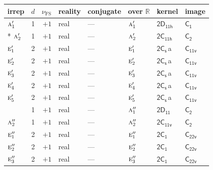 \documentclass[10pt,a4paper]{article}
\numberwithin{equation}{section}
\newcommand{\grp}[1]{\mathsf{#1}}
\newcommand{\irr}[1]{\text{\normalfont\scshape #1}}
\newcommand{\detbox}[1]{{\setlength{\fboxsep}{1pt}\fbox{#1}}}
\newcommand{\clsletter}[1]{\,{\scriptsize\color{black!55}#1}}
\newcommand{\fsind}{\nu_{\mathrm{FS}}}
\begin{document}
\setlength{\emergencystretch}{2em}\par\setlength{\emergencystretch}{0pt}
{\small\renewcommand{\arraystretch}{1.25}\setlength{\tabcolsep}{4pt}\begin{longtable}{@{}lrrlllll@{}}\toprule
irrep & $d$ & $\fsind$ & reality & conjugate & over $\mathbb{R}$ & kernel & image\\\midrule\endhead
\bottomrule\endfoot\endlastfoot
$\irr{a}_{1}'$ & 1 & $+1$ & real & --- & $\irr{a}_{1}'$ & \href{2D11h.pdf}{$\grp{2D_{11h}}$} & \href{../../../rotation/data/pdf/C1.pdf}{$\grp{C_{1}}$}\\*
$\irr{a}_{2}'$ & 1 & $+1$ & real & --- & $\irr{a}_{2}'$ & \href{2C11h.pdf}{$\grp{2C_{11h}}$} & \href{../../../rotation/data/pdf/C2.pdf}{$\grp{C_{2}}$}\\
$\irr{e}_{1}'$ & 2 & $+1$ & real & --- & $\irr{e}_{1}'$ & \href{2C1v.pdf}{$\grp{2C_{s}}$}\clsletter{a} & \href{../../../rotation/data/pdf/C11v.pdf}{$\grp{C_{11v}}$}\\
$\irr{e}_{2}'$ & 2 & $+1$ & real & --- & $\irr{e}_{2}'$ & \href{2C1v.pdf}{$\grp{2C_{s}}$}\clsletter{a} & \href{../../../rotation/data/pdf/C11v.pdf}{$\grp{C_{11v}}$}\\
$\irr{e}_{3}'$ & 2 & $+1$ & real & --- & $\irr{e}_{3}'$ & \href{2C1v.pdf}{$\grp{2C_{s}}$}\clsletter{a} & \href{../../../rotation/data/pdf/C11v.pdf}{$\grp{C_{11v}}$}\\
$\irr{e}_{4}'$ & 2 & $+1$ & real & --- & $\irr{e}_{4}'$ & \href{2C1v.pdf}{$\grp{2C_{s}}$}\clsletter{a} & \href{../../../rotation/data/pdf/C11v.pdf}{$\grp{C_{11v}}$}\\
$\irr{e}_{5}'$ & 2 & $+1$ & real & --- & $\irr{e}_{5}'$ & \href{2C1v.pdf}{$\grp{2C_{s}}$}\clsletter{a} & \href{../../../rotation/data/pdf/C11v.pdf}{$\grp{C_{11v}}$}\\
\detbox{$\irr{a}_{1}''$} & 1 & $+1$ & real & --- & $\irr{a}_{1}''$ & \href{2D11.pdf}{$\grp{2D_{11}}$} & \href{../../../rotation/data/pdf/C2.pdf}{$\grp{C_{2}}$}\\
$\irr{a}_{2}''$ & 1 & $+1$ & real & --- & $\irr{a}_{2}''$ & \href{2C11v.pdf}{$\grp{2C_{11v}}$} & \href{../../../rotation/data/pdf/C2.pdf}{$\grp{C_{2}}$}\\
$\irr{e}_{1}''$ & 2 & $+1$ & real & --- & $\irr{e}_{1}''$ & \href{2C1.pdf}{$\grp{2C_{1}}$} & $\grp{C_{22v}}$\\
$\irr{e}_{2}''$ & 2 & $+1$ & real & --- & $\irr{e}_{2}''$ & \href{2C1.pdf}{$\grp{2C_{1}}$} & $\grp{C_{22v}}$\\
$\irr{e}_{3}''$ & 2 & $+1$ & real & --- & $\irr{e}_{3}''$ & \href{2C1.pdf}{$\grp{2C_{1}}$} & $\grp{C_{22v}}$\\

\end{longtable}}
\end{document}
